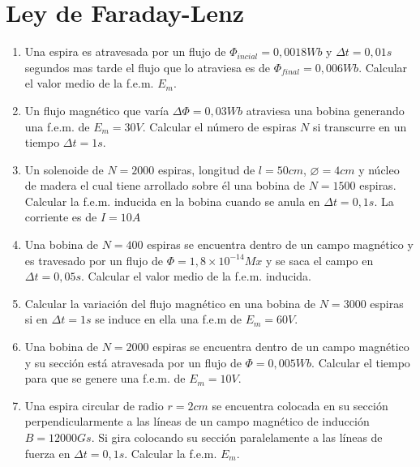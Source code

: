 \documentclass[../main]{subfiles}
\begin{document}
\chapter{Ley de Faraday-Lenz}


\begin{enumerate}
    \item Una espira es atravesada por un flujo de $\Phi_{incial}=0,0018Wb$ y $\Delta t=0,01s$ segundos mas tarde el flujo que lo atraviesa es de $\Phi_{final}= 0,006Wb$. Calcular el valor medio de la f.e.m. $E_m$.
    \item Un flujo magnético que varía $\Delta \Phi = 0,03Wb$ atraviesa una bobina generando una f.e.m. de $E_m=30V$. Calcular el número de espiras $N$ si transcurre en un tiempo $\Delta t=1s$.
    \item Un solenoide de $N=2000$ espiras, longitud de $l=50cm$, $\varnothing=4cm$ y núcleo de madera el cual tiene arrollado sobre él una bobina de $N=1500$ espiras. Calcular la f.e.m. inducida en la bobina cuando se anula en $\Delta t=0,1s$. La corriente es de $I=10A$ 
    \item Una bobina de $N=400$ espiras se encuentra dentro de un campo magnético y es travesado por un flujo de $\Phi=1,8\times10^{-14}Mx$ y se saca el campo en $\Delta t=0,05s$. Calcular el valor medio de la f.e.m. inducida.
    \item Calcular la variación del flujo magnético en una bobina de $N=3000$ espiras si en $\Delta t = 1s$ se induce en ella una f.e.m de $E_m=60V$.
    \item Una bobina de $N=2000$ espiras se encuentra dentro de un campo magnético y su sección está atravesada por un flujo de $\Phi=0,005Wb$. Calcular el tiempo para que se genere una f.e.m. de $E_m=10V$.
    \item Una espira circular de radio $r=2cm$ se encuentra colocada en su sección perpendicularmente a las líneas de un campo magnético de inducción $B=12000Gs$. Si gira colocando su sección paralelamente a las líneas de fuerza en $\Delta t=0,1s$. Calcular la f.e.m. $E_m$.
\end{enumerate}
\end{document}
